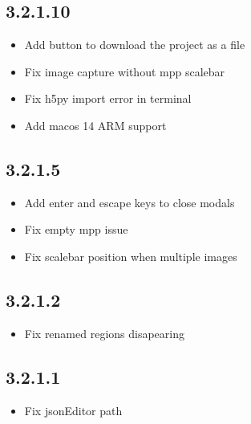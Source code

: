 \documentclass[letterpaper,10pt,english,openany,oneside]{sphinxmanual}
\begin{document}
\subsection{3.2.1.10}
\label{\detokenize{docs/intro/versions:id2}}\begin{itemize}
\item {} 
\sphinxAtStartPar
Add  button to download the project as a  file

\item {} 
\sphinxAtStartPar
Fix image capture without mpp scalebar

\item {} 
\sphinxAtStartPar
Fix h5py import error in terminal

\item {} 
\sphinxAtStartPar
Add macos 14 ARM support

\end{itemize}


\subsection{3.2.1.5}
\label{\detokenize{docs/intro/versions:id3}}\begin{itemize}
\item {} 
\sphinxAtStartPar
Add enter and escape keys to close modals

\item {} 
\sphinxAtStartPar
Fix empty mpp issue

\item {} 
\sphinxAtStartPar
Fix scalebar position when multiple images

\end{itemize}


\subsection{3.2.1.2}
\label{\detokenize{docs/intro/versions:id4}}\begin{itemize}
\item {} 
\sphinxAtStartPar
Fix renamed regions disapearing

\end{itemize}


\subsection{3.2.1.1}
\label{\detokenize{docs/intro/versions:id5}}\begin{itemize}
\item {} 
\sphinxAtStartPar
Fix jsonEditor path

\end{itemize}
\end{document}
